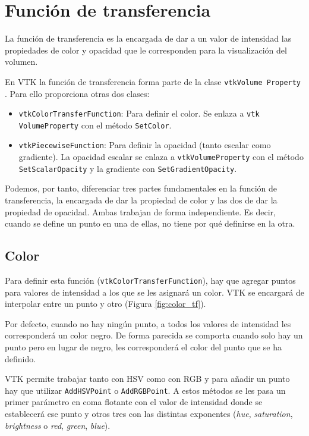 \section{Función de transferencia}

La función de transferencia es la encargada de dar a un valor de intensidad las propiedades de color y opacidad que le corresponden para la visualización del volumen.

En VTK la función de transferencia forma parte de la clase \texttt{vtkVolume Property} \cite{vtk_example_medical4}. Para ello proporciona otras dos clases:
\begin{itemize}
	\item \texttt{vtkColorTransferFunction}: Para definir el color. Se enlaza a \texttt{vtk VolumeProperty} con el método \texttt{SetColor}.
	\item \texttt{vtkPiecewiseFunction}: Para definir la opacidad (tanto escalar como gradiente). La opacidad escalar se enlaza a \texttt{vtkVolumeProperty} con el método \texttt{SetScalarOpacity} y la gradiente con \texttt{SetGradientOpacity}.
\end{itemize}

Podemos, por tanto, diferenciar tres partes fundamentales en la función de transferencia, la encargada de dar la propiedad de color y las dos de dar la propiedad de opacidad. Ambas trabajan de forma independiente. Es decir, cuando se define un punto en una de ellas, no tiene por qué definirse en la otra.

\subsection{Color}

Para definir esta función (\texttt{vtkColorTransferFunction}), hay que agregar puntos para valores de intensidad a los que se les asignará un color. VTK se encargará de interpolar entre un punto y otro (Figura \ref{fig:color_tf}). 

Por defecto, cuando no hay ningún punto, a todos los valores de intensidad les corresponderá un color negro. De forma parecida se comporta cuando solo hay un punto pero en lugar de negro, les corresponderá el color del punto que se ha definido.

VTK permite trabajar tanto con HSV como con RGB y para añadir un punto hay que utilizar \texttt{AddHSVPoint} o \texttt{AddRGBPoint}. A estos métodos se les pasa un primer parámetro en coma flotante con el valor de intensidad donde se establecerá ese punto y otros tres con las distintas exponentes (\textit{hue}, \textit{saturation}, \textit{brightness} o \textit{red}, \textit{green}, \textit{blue}).

